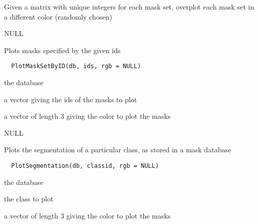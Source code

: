 \documentclass[a4paper]{book}
\begin{document}
%
\begin{Details}\relax
Given a matrix with unique integers for each mask set,
overplot each mask set in a different color (randomly
chosen)
\end{Details}
%
\begin{Value}
NULL
\end{Value}
%
\begin{Description}\relax
Plots masks specified by the given ids
\end{Description}
%
\begin{Usage}
\begin{verbatim}
  PlotMaskSetByID(db, ids, rgb = NULL)
\end{verbatim}
\end{Usage}
%
\begin{Arguments}
\begin{ldescription}
\item[\code{db}] the database

\item[\code{ids}] a vector giving the ids of the masks to plot

\item[\code{rgb}] a vector of length 3 giving the color to plot
the masks
\end{ldescription}
\end{Arguments}
%
\begin{Value}
NULL
\end{Value}
%
\begin{Description}\relax
Plots the segmentation of a particular class, as stored
in a mask database
\end{Description}
%
\begin{Usage}
\begin{verbatim}
  PlotSegmentation(db, classid, rgb = NULL)
\end{verbatim}
\end{Usage}
%
\begin{Arguments}
\begin{ldescription}
\item[\code{db}] the database

\item[\code{classid}] the class to plot

\item[\code{rgb}] a vector of length 3 giving the color to plot
the masks
\end{ldescription}
\end{Arguments}
\end{document}

